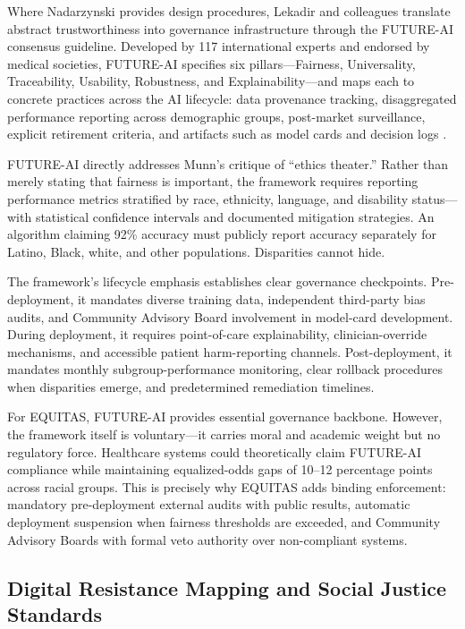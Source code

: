 \documentclass[12pt,a4paper]{article}
\begin{document}
Where Nadarzynski provides design procedures, Lekadir and colleagues translate abstract trustworthiness into governance infrastructure through the FUTURE-AI consensus guideline. Developed by 117 international experts and endorsed by medical societies, FUTURE-AI specifies six pillars—Fairness, Universality, Traceability, Usability, Robustness, and Explainability—and maps each to concrete practices across the AI lifecycle: data provenance tracking, disaggregated performance reporting across demographic groups, post-market surveillance, explicit retirement criteria, and artifacts such as model cards and decision logs \citep{Lekadir2025}.

FUTURE-AI directly addresses Munn's critique of ``ethics theater.'' Rather than merely stating that fairness is important, the framework requires reporting performance metrics stratified by race, ethnicity, language, and disability status—with statistical confidence intervals and documented mitigation strategies. An algorithm claiming 92\% accuracy must publicly report accuracy separately for Latino, Black, white, and other populations. Disparities cannot hide.

The framework's lifecycle emphasis establishes clear governance checkpoints. Pre-deployment, it mandates diverse training data, independent third-party bias audits, and Community Advisory Board involvement in model-card development. During deployment, it requires point-of-care explainability, clinician-override mechanisms, and accessible patient harm-reporting channels. Post-deployment, it mandates monthly subgroup-performance monitoring, clear rollback procedures when disparities emerge, and predetermined remediation timelines.

For EQUITAS, FUTURE-AI provides essential governance backbone. However, the framework itself is voluntary—it carries moral and academic weight but no regulatory force. Healthcare systems could theoretically claim FUTURE-AI compliance while maintaining equalized-odds gaps of 10--12 percentage points across racial groups. This is precisely why EQUITAS adds binding enforcement: mandatory pre-deployment external audits with public results, automatic deployment suspension when fairness thresholds are exceeded, and Community Advisory Boards with formal veto authority over non-compliant systems.

\subsection{Digital Resistance Mapping and Social Justice Standards}
\end{document}
